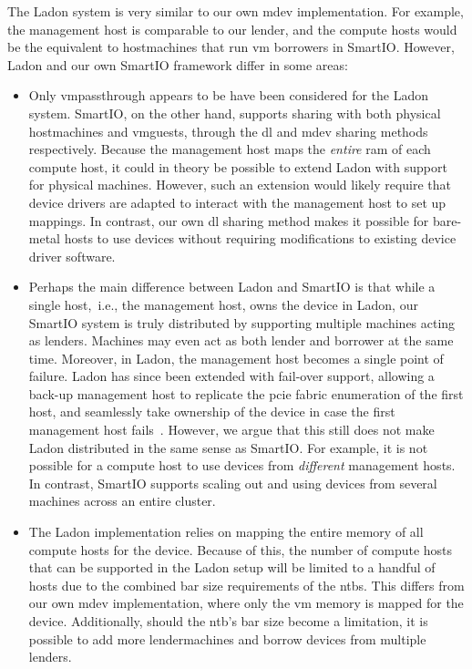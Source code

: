 The Ladon system is very similar to our own \gls{mdev} implementation.
%
For example, the management host is comparable to our \gls{lender}, and the compute hosts would be the equivalent to \glspl{hostmachine} that run \gls{vm} \glspl{borrower} in SmartIO.
%
However, Ladon and our own SmartIO framework differ in some areas:
\begin{itemize}
    \item 
        Only \gls{vmpassthrough} appears to be have been considered for the Ladon system.
        SmartIO, on the other hand, supports sharing with both physical \glspl{hostmachine} and \glspl{vmguest}, through the \gls{dl} and \gls{mdev} sharing methods respectively.
        Because the management host maps the \emph{entire} \gls{ram} of each compute host, it could in theory be possible to extend Ladon with support for physical machines. 
        However, such an extension would likely require that device drivers are adapted to interact with the management host to set up mappings.
        In contrast, our own \gls{dl} sharing method makes it possible for bare-metal hosts to use devices without requiring modifications to existing device driver software.

    \item
        Perhaps the main difference between Ladon and SmartIO is that while a single host,~i.e., the management host, owns the device in Ladon, our SmartIO system is truly distributed by supporting multiple machines acting as \glspl{lender}.
        Machines may even act as both \gls{lender} and \gls{borrower} at the same time.
        Moreover, in Ladon, the management host becomes a single point of failure.
        Ladon has since been extended with fail-over support, allowing a back-up management host to replicate the \gls{pcie} fabric enumeration of the first host, and seamlessly take ownership of the device in case the first management host fails~\cite{Tu2018}.
        However, we argue that this still does not make Ladon distributed in the same sense as SmartIO.
        For example, it is not possible for a compute host to use devices from \emph{different} management hosts.
        In contrast, SmartIO supports scaling out and using devices from several machines across an entire cluster.

    \item
        The Ladon implementation relies on mapping the entire memory of all compute hosts for the device.
        Because of this, the number of compute hosts that can be supported in the Ladon setup will be limited to a handful of hosts due to the combined \gls{bar} size requirements of the \glspl{ntb}.
        This differs from our own \gls{mdev} implementation, where only the \gls{vm} memory is mapped for the device.
        Additionally, should the \gls{ntb}'s \gls{bar} size become a limitation, it is possible to add more \glspl{lendermachine} and borrow devices from multiple \glspl{lender}.
        
\end{itemize}



